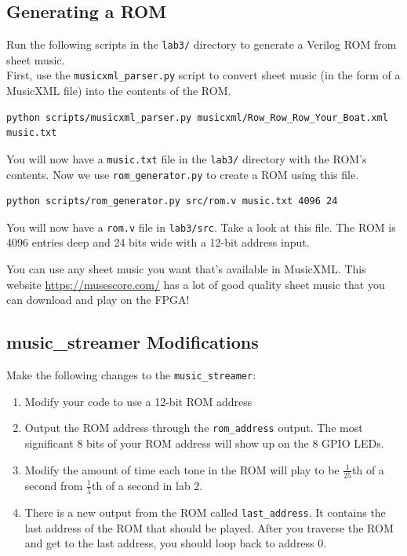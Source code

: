 \documentclass[11pt]{article}
\begin{document}
\subsection{Generating a ROM}
Run the following scripts in the \verb|lab3/| directory to generate a Verilog ROM from sheet music.\\

First, use the \verb|musicxml_parser.py| script to convert sheet music (in the form of a MusicXML file) into the contents of the ROM.

\begin{verbatim}
python scripts/musicxml_parser.py musicxml/Row_Row_Row_Your_Boat.xml music.txt
\end{verbatim}

You will now have a \verb|music.txt| file in the \verb|lab3/| directory with the ROM's contents. Now we use \verb|rom_generator.py| to create a ROM using this file.

\begin{verbatim}
python scripts/rom_generator.py src/rom.v music.txt 4096 24
\end{verbatim}

You will now have a \verb|rom.v| file in \verb|lab3/src|. Take a look at this file. The ROM is 4096 entries deep and 24 bits wide with a 12-bit address input. 

You can use any sheet music you want that's available in MusicXML. This website \url{https://musescore.com/} has a lot of good quality sheet music that you can download and play on the FPGA!

\subsection{music\_streamer Modifications}

Make the following changes to the \verb|music_streamer|:

\begin{enumerate}
	\item Modify your code to use a 12-bit ROM address
	
	\item Output the ROM address through the \verb|rom_address| output. The most significant 8 bits of your ROM address will show up on the 8 GPIO LEDs.
	
	\item Modify the amount of time each tone in the ROM will play to be $\frac{1}{25}$th of a second from $\frac{1}{5}$th of a second in lab 2.
	
	\item There is a new output from the ROM called \verb|last_address|. It contains the last address of the ROM that should be played. After you traverse the ROM and get to the last address, you should loop back to address 0.
\end{enumerate}
\end{document}
